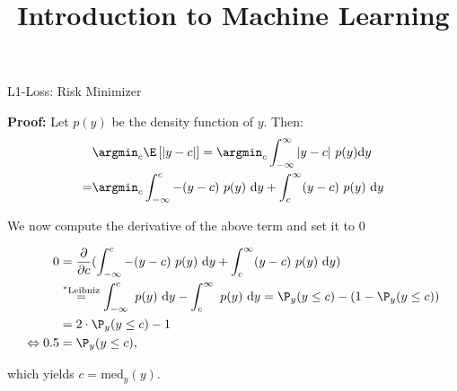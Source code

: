 \documentclass[11pt,compress,t,notes=noshow, xcolor=table]{beamer}
\title{Introduction to Machine Learning}
\begin{document}
    

\begin{frame2}[footnotesize]{L1-Loss: Risk Minimizer}

\textbf{Proof:} Let $p(y)$ be the density function of $y$. Then: 
  \begin{align*}
   &\argmin_c \E\left[|y - c|\right] = \argmin_c \int_{-\infty}^\infty |y - c| ~ p(y) \text{d}y \\
  =& \argmin_c \int_{-\infty}^c -(y - c)~p(y)~\text{d}y + \int_c^\infty (y - c)~p(y)~\text{d}y 
  \end{align*}

We now compute the derivative of the above term and set it to $0$

\begin{align*}
0 &= \frac{\partial}{\partial c} (\int_{-\infty}^c -(y - c)~p(y)~\text{d}y + \int_c^\infty (y - c)~p(y)~\text{d}y) \\ &\overset{^\ast\text{Leibniz}}{=} \int_{-\infty}^c  ~p(y)~\text{d}y - \int_c^\infty ~p(y)~\text{d}y =   \P_y (y \le c) - (1 - \P_y (y \le c)) \\
&= 2 \cdot \P_y (y \le c) - 1 \\
\Leftrightarrow 0.5 &= \P_y (y \le c),
\end{align*}

which yields $c = \text{med}_y(y)$. 

\end{frame2}
\end{document}
